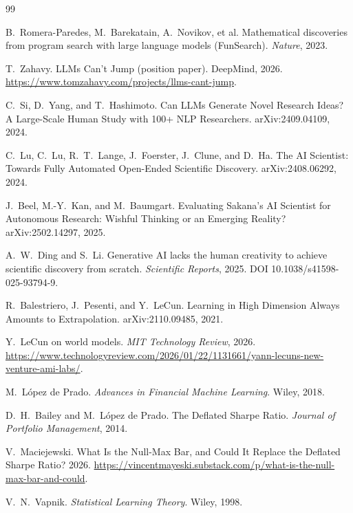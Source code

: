 \documentclass[11pt]{article}
\begin{document}
\begin{thebibliography}{99}

 B.~Romera-Paredes, M.~Barekatain, A.~Novikov, et al.
\newblock Mathematical discoveries from program search with large language models (FunSearch).
\newblock \emph{Nature}, 2023.

 T.~Zahavy.
\newblock LLMs Can't Jump (position paper). DeepMind, 2026.
\newblock \url{https://www.tomzahavy.com/projects/llms-cant-jump}.

 C.~Si, D.~Yang, and T.~Hashimoto.
\newblock Can LLMs Generate Novel Research Ideas? A Large-Scale Human Study with 100+ NLP Researchers.
\newblock arXiv:2409.04109, 2024.

 C.~Lu, C.~Lu, R.~T.~Lange, J.~Foerster, J.~Clune, and D.~Ha.
\newblock The AI Scientist: Towards Fully Automated Open-Ended Scientific Discovery.
\newblock arXiv:2408.06292, 2024.

 J.~Beel, M.-Y.~Kan, and M.~Baumgart.
\newblock Evaluating Sakana's AI Scientist for Autonomous Research: Wishful Thinking or an Emerging
Reality?
\newblock arXiv:2502.14297, 2025.

 A.~W.~Ding and S.~Li.
\newblock Generative AI lacks the human creativity to achieve scientific discovery from scratch.
\newblock \emph{Scientific Reports}, 2025. DOI 10.1038/s41598-025-93794-9.

 R.~Balestriero, J.~Pesenti, and Y.~LeCun.
\newblock Learning in High Dimension Always Amounts to Extrapolation. arXiv:2110.09485, 2021.

 Y.~LeCun on world models. \emph{MIT Technology Review}, 2026.
\newblock \url{https://www.technologyreview.com/2026/01/22/1131661/yann-lecuns-new-venture-ami-labs/}.

 M.~L\'opez de Prado.
\newblock \emph{Advances in Financial Machine Learning}. Wiley, 2018.

 D.~H.~Bailey and M.~L\'opez de Prado.
\newblock The Deflated Sharpe Ratio. \emph{Journal of Portfolio Management}, 2014.

 V.~Maciejewski.
\newblock What Is the Null-Max Bar, and Could It Replace the Deflated Sharpe Ratio? 2026.
\newblock \url{https://vincentmayeski.substack.com/p/what-is-the-null-max-bar-and-could}.

 V.~N.~Vapnik. \emph{Statistical Learning Theory}. Wiley, 1998.


\end{thebibliography}
\end{document}
